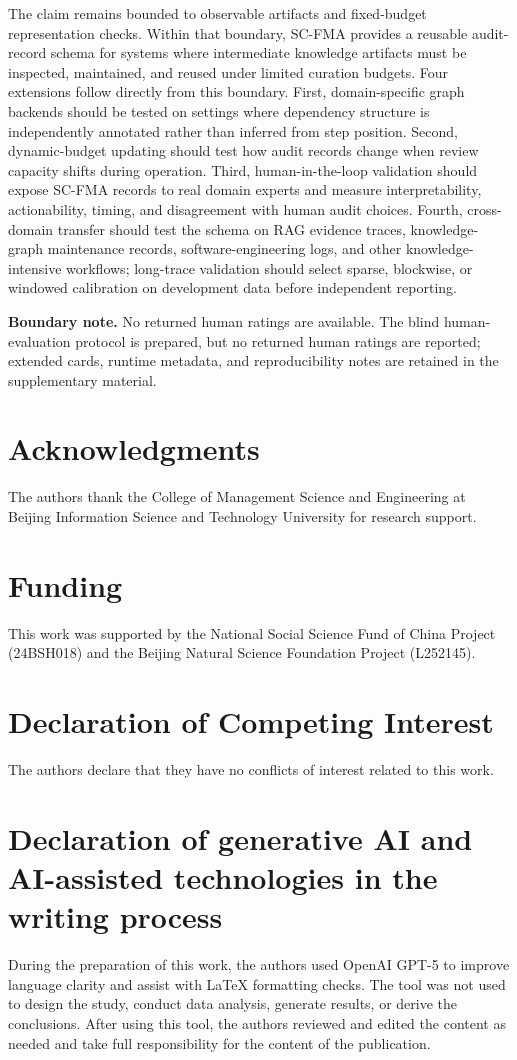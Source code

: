 \documentclass[pdflatex,sn-mathphys-num,iicol]{sn-jnl}
\begin{document}
The claim remains bounded to observable artifacts and fixed-budget representation checks. Within that boundary, SC-FMA provides a reusable audit-record schema for systems where intermediate knowledge artifacts must be inspected, maintained, and reused under limited curation budgets. Four extensions follow directly from this boundary. First, domain-specific graph backends should be tested on settings where dependency structure is independently annotated rather than inferred from step position. Second, dynamic-budget updating should test how audit records change when review capacity shifts during operation. Third, human-in-the-loop validation should expose SC-FMA records to real domain experts and measure interpretability, actionability, timing, and disagreement with human audit choices. Fourth, cross-domain transfer should test the schema on RAG evidence traces, knowledge-graph maintenance records, software-engineering logs, and other knowledge-intensive workflows; long-trace validation should select sparse, blockwise, or windowed calibration on development data before independent reporting.


\noindent\textbf{Boundary note.} No returned human ratings are available. The blind human-evaluation protocol is prepared, but no returned human ratings are reported; extended cards, runtime metadata, and reproducibility notes are retained in the supplementary material.


\section*{Acknowledgments}
The authors thank the College of Management Science and Engineering at Beijing Information Science and Technology University for research support.

\section*{Funding}
This work was supported by the National Social Science Fund of China Project (24BSH018) and the Beijing Natural Science Foundation Project (L252145).

\section*{Declaration of Competing Interest}
The authors declare that they have no conflicts of interest related to this work.

\section*{Declaration of generative AI and AI-assisted technologies in the writing process}
During the preparation of this work, the authors used OpenAI GPT-5 to improve language clarity and assist with LaTeX formatting checks. The tool was not used to design the study, conduct data analysis, generate results, or derive the conclusions. After using this tool, the authors reviewed and edited the content as needed and take full responsibility for the content of the publication.
\end{document}
